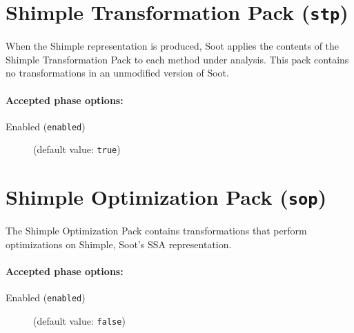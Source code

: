 \documentclass{article}
\begin{document}
\section{Shimple Transformation Pack ({\tt stp})}

          
\par

            When the Shimple representation is produced, Soot applies the
            contents of the Shimple Transformation Pack to each method
            under analysis.  This pack contains no transformations in an
            unmodified version of Soot.
          
        

\paragraph{Accepted phase options:} 

\begin{description}

\item[Enabled ({\tt enabled})]
(default value: {\tt true})






\end{description}

\section{Shimple Optimization Pack ({\tt sop})}

          
\par

            The Shimple Optimization Pack contains transformations that
            perform optimizations on Shimple, Soot's SSA
            representation.
          
        

\paragraph{Accepted phase options:} 

\begin{description}

\item[Enabled ({\tt enabled})]
(default value: {\tt false})






\end{description}
\end{document}
